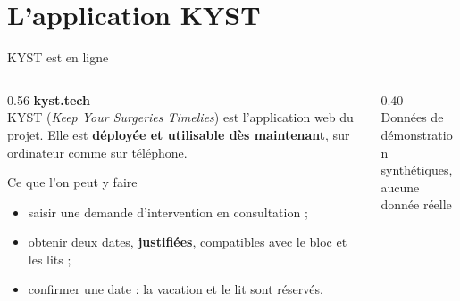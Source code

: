 \section{L'application KYST}

\begin{frame}{KYST est en ligne}
  \begin{columns}[c,onlytextwidth]
    \begin{column}{0.56\textwidth}
      {\Large\bfseries\color{mcmPrimary} kyst.tech}\\[0.3cm]
      \small
      KYST (\emph{Keep Your Surgeries Timelies}) est l'application web du
      projet. Elle est \textbf{déployée et utilisable dès maintenant}, sur
      ordinateur comme sur téléphone.
      \vspace{0.15cm}
      \begin{exampleblock}{Ce que l'on peut y faire}
        \begin{itemize}
          \item saisir une demande d'intervention en consultation ;
          \item obtenir deux dates, \textbf{justifiées}, compatibles avec le
            bloc et les lits ;
          \item confirmer une date : la vacation et le lit sont réservés.
        \end{itemize}
      \end{exampleblock}
    \end{column}
    \begin{column}{0.40\textwidth}
      \centering
      \\[0.2cm]
      {\footnotesize Données de démonstration\\synthétiques, aucune donnée réelle}
    \end{column}
  \end{columns}
\end{frame}

